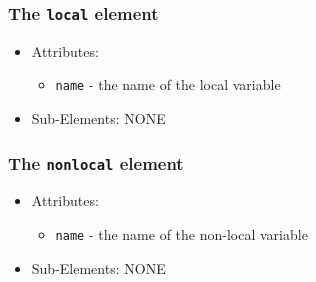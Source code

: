 \documentclass{article}
\begin{document}
\subsubsection{The {\tt local} element}
  \begin{itemize}
    \item Attributes:
    \begin{itemize}
      \item {\tt name} - the name of the local variable
    \end{itemize}
    \item Sub-Elements: NONE
  \end{itemize}

\subsubsection{The {\tt nonlocal} element}
  \begin{itemize}
    \item Attributes:
    \begin{itemize}
      \item {\tt name} - the name of the non-local variable
    \end{itemize}
    \item Sub-Elements: NONE
  \end{itemize}
\end{document}
